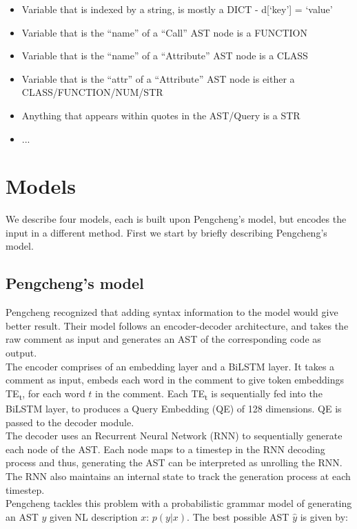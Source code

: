 \documentclass{IEEEtran}
\begin{document}
    \begin{itemize}
      \item Variable that is indexed by a string, is mostly a DICT - d[`key'] = `value'
      \item Variable that is the ``name'' of a ``Call'' AST node is a FUNCTION
      \item Variable that is the ``name'' of a ``Attribute'' AST node is a CLASS
      \item Variable that is the ``attr'' of a ``Attribute'' AST node is either a 
        CLASS/FUNCTION/NUM/STR
      \item Anything that appears within quotes in the AST/Query is a STR
      \item ...
    \end{itemize}

    \section{Models}
    We describe four models, each is built upon Pengcheng's model, but encodes the input in a 
    different method. First we start by briefly describing Pengcheng's model.

      \subsection{Pengcheng's model}
      Pengcheng recognized that adding syntax information to the model would give better
      result. Their model follows an encoder-decoder architecture, and takes
      the raw comment as input and generates an AST of the corresponding 
      code as output. \\
      \hspace*{4mm}The encoder comprises of an embedding layer and a BiLSTM
      layer. It takes a comment as input, embeds each word in the comment to give token embeddings
      TE\textsubscript{t}, for each word $ t $ in the comment. Each TE\textsubscript{t} is 
      sequentially fed into the 
      BiLSTM layer, to produces a Query Embedding (QE) of 128 dimensions. QE is passed to the
      decoder module. \\
      \hspace*{4mm}The decoder uses an Recurrent Neural Network (RNN) to sequentially generate 
      each node of the AST. Each node maps to a timestep in the RNN decoding process and thus, 
      generating the AST can be interpreted as unrolling the RNN. The RNN also maintains an 
      internal state to track the generation process at each timestep. \\
      \hspace*{4mm}Pengcheng tackles this problem with a probabilistic grammar model of
      generating an AST $ y $ given NL description $ x $: $ p(y\vert x) $. The best possible AST 
      $ \hat{y} $ is given by:
\end{document}
